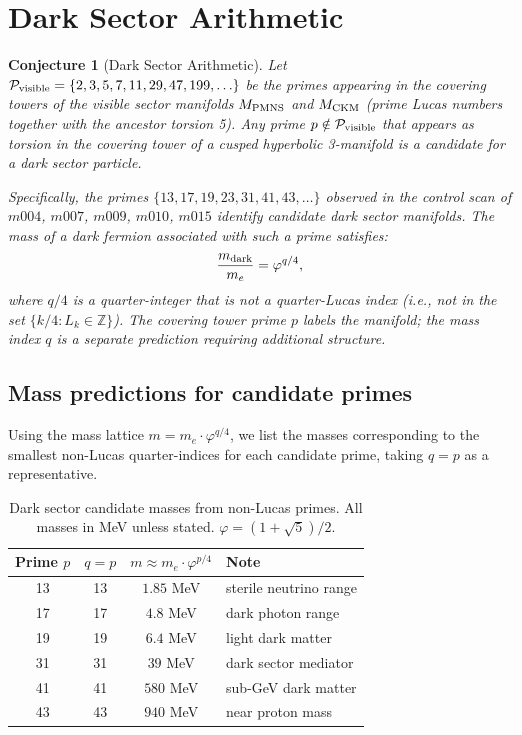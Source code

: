 \documentclass[12pt]{article}
\newtheorem{conjecture}{Conjecture}
\newcommand{\Z}{\mathbb{Z}}
\newcommand{\ph}{\varphi}
\begin{document}
\section{Dark Sector Arithmetic}
\label{sec:dark}

\begin{conjecture}[Dark Sector Arithmetic]
\label{conj:dark}
Let $\mathcal{P}_{\rm visible} = \{2,3,5,7,11,29,47,199,\ldots\}$
be the primes appearing in the covering towers of the visible
sector manifolds $M_{\rm PMNS}$ and $M_{\rm CKM}$ (prime Lucas
numbers together with the ancestor torsion 5).
Any prime $p \notin \mathcal{P}_{\rm visible}$ that appears as
torsion in the covering tower of a cusped hyperbolic 3-manifold
is a candidate for a dark sector particle.

Specifically, the primes $\{13, 17, 19, 23, 31, 41, 43, \ldots\}$
observed in the control scan of $m004$, $m007$, $m009$, $m010$,
$m015$ identify candidate dark sector manifolds.
The mass of a dark fermion associated with such a prime satisfies:
\[
  \frac{m_{\rm dark}}{m_e} = \ph^{q/4},
\]
where $q/4$ is a quarter-integer that is \emph{not} a quarter-Lucas
index (i.e., not in the set $\{k/4 : L_k\in\Z\}$). The covering
tower prime $p$ labels the manifold; the mass index $q$ is a
separate prediction requiring additional structure.
\end{conjecture}

\subsection{Mass predictions for candidate primes}

Using the mass lattice $m = m_e\cdot\ph^{q/4}$, we list the
masses corresponding to the smallest non-Lucas quarter-indices
for each candidate prime, taking $q = p$ as a representative.

\begin{table}[htbp]
\centering
\caption{Dark sector candidate masses from non-Lucas primes.
All masses in MeV unless stated. $\ph = (1+\sqrt{5})/2$.}
\label{tab:dark}
\begin{tabular}{cccl}
\toprule
Prime $p$ & $q = p$ & $m \approx m_e \cdot \ph^{p/4}$ & Note \\
\midrule
13 & 13 & $1.85$ MeV  & sterile neutrino range \\
17 & 17 & $4.8$ MeV   & dark photon range \\
19 & 19 & $6.4$ MeV   & light dark matter \\
31 & 31 & $39$ MeV    & dark sector mediator \\
41 & 41 & $580$ MeV   & sub-GeV dark matter \\
43 & 43 & $940$ MeV   & near proton mass \\
\bottomrule
\end{tabular}
\end{table}
\end{document}
